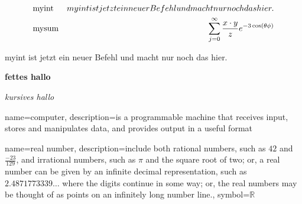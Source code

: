 \documentclass[12pt, a4paper, twopage]{scrartcl}
\begin{document}
\begin{appendix}
\begin{align*}
  &\text{myint} & \myint\\
  &\text{mysum} & \mysum{x}{y}{z}
\end{align*}

\renewcommand{\myint}{myint ist jetzt ein neuer Befehl und macht nur noch das hier.}

\myint

\vspace{2cm}
\newcommand{\fett}[1]{{\bf #1}}

\fett{fettes hallo}

\newcommand{\kursiv}[1]{{\it #1}}

\kursiv{kursives hallo}



\end{appendix}







\printbibliography











{
	name=computer,
	description={is a programmable machine that receives input,
		stores and manipulates data, and provides
		output in a useful format}
}


{
	name={real number},
	description={include both rational numbers, such as $42$ and 
		$\frac{-23}{129}$, and irrational numbers, 
		such as $\pi$ and the square root of two; or,
		a real number can be given by an infinite decimal
		representation, such as $2.4871773339\ldots$ where
		the digits continue in some way; or, the real
		numbers may be thought of as points on an infinitely
		long number line.},
	symbol={\ensuremath{\mathbb{R}}}
}


\printglossary[title=My Glossary, toctitle=Glossary Title in ToC ]
\end{document}
